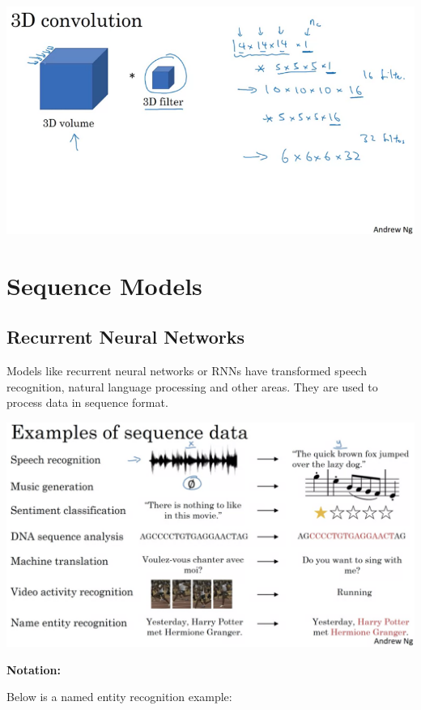 \documentclass{article}
\begin{document}
\begin{center}
\includegraphics[scale=0.4]{./images/conv_3d.png}
\end{center}

\section{Sequence Models}

\subsection{Recurrent Neural Networks}

\noindent Models like recurrent neural networks or RNNs have transformed speech recognition, natural language processing and other areas. They are used to process data in sequence format.

\begin{center}
\includegraphics[scale=0.3]{./images/sequence_models.png}
\end{center}

\noindent \textbf{Notation:}

\noindent Below is a named entity recognition example:
\end{document}
